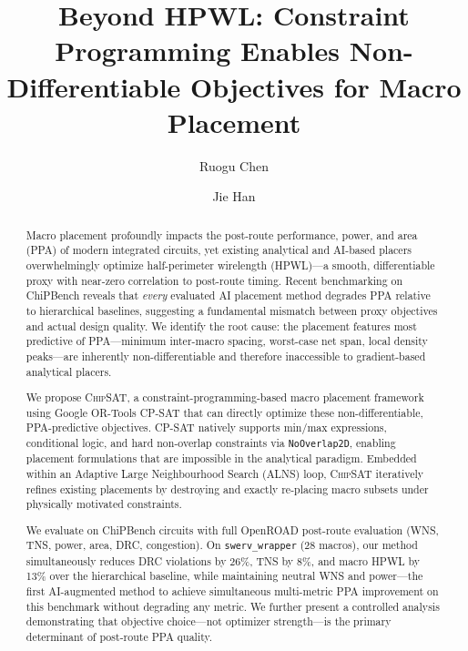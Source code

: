 \documentclass[sigconf,anonymous,review,9pt]{acmart}
\begin{document}
\title{Beyond HPWL: Constraint Programming Enables Non-Differentiable Objectives for Macro Placement}

\author{Ruogu Chen}

\author{Jie Han}

\begin{abstract}
Macro placement profoundly impacts the post-route performance, power, and area (PPA) of modern integrated circuits, yet existing analytical and AI-based placers overwhelmingly optimize half-perimeter wirelength (HPWL)---a smooth, differentiable proxy with near-zero correlation to post-route timing. Recent benchmarking on ChiPBench reveals that \emph{every} evaluated AI placement method degrades PPA relative to hierarchical baselines, suggesting a fundamental mismatch between proxy objectives and actual design quality. We identify the root cause: the placement features most predictive of PPA---minimum inter-macro spacing, worst-case net span, local density peaks---are inherently non-differentiable and therefore inaccessible to gradient-based analytical placers.

We propose \textsc{ChipSAT}, a constraint-programming-based macro placement framework using Google OR-Tools CP-SAT that can directly optimize these non-differentiable, PPA-predictive objectives. CP-SAT natively supports min/max expressions, conditional logic, and hard non-overlap constraints via \texttt{NoOverlap2D}, enabling placement formulations that are impossible in the analytical paradigm. Embedded within an Adaptive Large Neighbourhood Search (ALNS) loop, \textsc{ChipSAT} iteratively refines existing placements by destroying and exactly re-placing macro subsets under physically motivated constraints.

We evaluate on ChiPBench circuits with full OpenROAD post-route evaluation (WNS, TNS, power, area, DRC, congestion). On \texttt{swerv\_wrapper} (28 macros), our method simultaneously reduces DRC violations by 26\%, TNS by 8\%, and macro HPWL by 13\% over the hierarchical baseline, while maintaining neutral WNS and power---the first AI-augmented method to achieve simultaneous multi-metric PPA improvement on this benchmark without degrading any metric. We further present a controlled analysis demonstrating that objective choice---not optimizer strength---is the primary determinant of post-route PPA quality.
\end{abstract}
\end{document}
